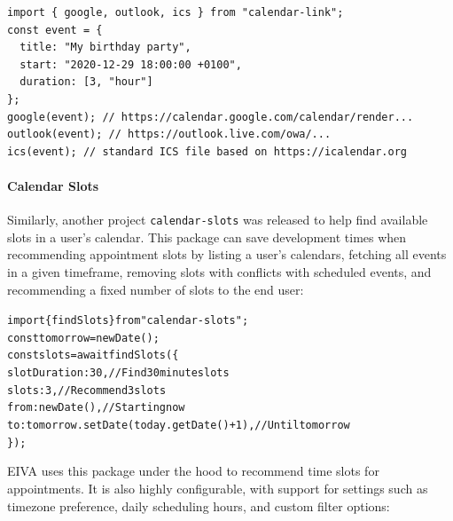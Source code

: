 \documentclass{article}
\begin{document}
\begin{verbatim}
import { google, outlook, ics } from "calendar-link";
const event = {
  title: "My birthday party",
  start: "2020-12-29 18:00:00 +0100",
  duration: [3, "hour"]
};
google(event); // https://calendar.google.com/calendar/render...
outlook(event); // https://outlook.live.com/owa/...
ics(event); // standard ICS file based on https://icalendar.org
\end{verbatim}

\paragraph{Calendar Slots}

Similarly, another project \texttt{calendar-slots} was released to help find available slots in a user's calendar. This package can save development times when recommending appointment slots by listing a user's calendars, fetching all events in a given timeframe, removing slots with conflicts with scheduled events, and recommending a fixed number of slots to the end user:

\begin{alltt}
\textcolor{keyword}{import} \{ findSlots \} \textcolor{keyword}{from} \textcolor{string}{"calendar-slots"};
\textcolor{keyword}{const} tomorrow = \textcolor{keyword}{new} Date();
\textcolor{keyword}{const} slots = \textcolor{keyword}{await} \textcolor{variable}{findSlots}(\{
  \textcolor{symbol}{slotDuration}: \textcolor{literal}{30}, \textcolor{comment}{// Find 30 minute slots}
  \textcolor{symbol}{slots}: \textcolor{literal}{3}, \textcolor{comment}{// Recommend 3 slots}
  \textcolor{symbol}{from}: \textcolor{keyword}{new} Date(), \textcolor{comment}{// Starting now}
  \textcolor{symbol}{to}: tomorrow.\textcolor{variable}{setDate}(today.\textcolor{variable}{getDate}() + \textcolor{literal}{1}), \textcolor{comment}{// Until tomorrow}
\});
\end{alltt}

EIVA uses this package under the hood to recommend time slots for appointments. It is also highly configurable, with support for settings such as timezone preference, daily scheduling hours, and custom filter options:
\end{document}

